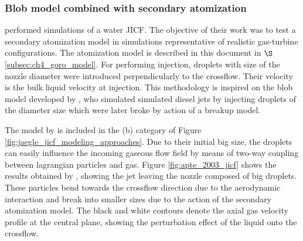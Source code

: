 \newpage

\subsubsection*{Blob model combined with secondary atomization }



 performed simulations of a water JICF. The objective of their work was to test a secondary atomization model in simulations representative of realistic gas-turbine configurations. The atomization model is described in this document in $\S$\ref{subsec:ch4_goro_model}. For performing injection, droplets with size of the nozzle diameter were introduced perpendicularly to the crossflow. Their velocity is the bulk liquid velocity at injection. This methodology is inspired on the blob model developed by , who simulated simulated diesel jets by injecting droplets of the diameter size which were later broke by action of a breakup model. 

The model by  is included in the (b) category of Figure \ref{fig:jaegle_jicf_modeling_approaches}. Due to their initial big size, the droplets can easily influence the incoming gaseous flow field by means of two-way coupling between lagrangian particles and gas. Figure \ref{fig:apte_2003_jicf} shows the results obtained by , showing the jet leaving the nozzle composed of big droplets. These particles bend towards the crossflow direction due to the aerodynamic interaction and break into smaller sizes due to the action of the secondary atomization model. The black and white contours denote the axial gas velocity profile at the central plane, showing the perturbation effect of the liquid onto the crossflow.

